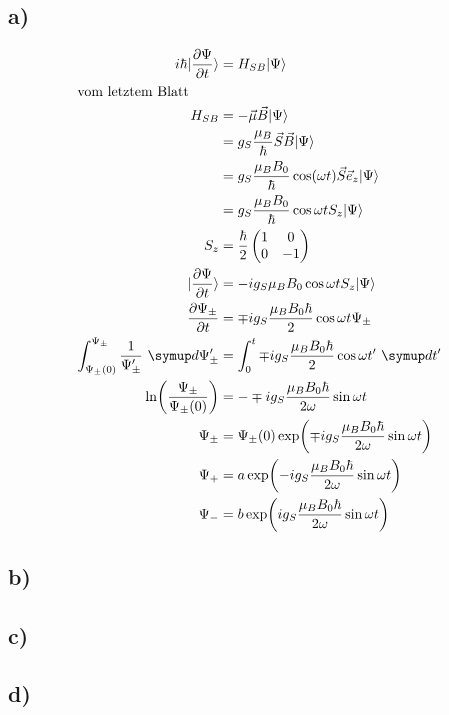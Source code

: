 \subsection{a)}
\begin{align}
    i \hbar \ket{\del{\Psi}{t}} &= H_{SB} \ket{\Psi}\\
    \intertext{vom letztem Blatt}
    H_{SB} &= - \vec{\mu} \vec B \ket{\Psi}\\
    &= g_S \frac{\mu _B}{\hbar} \vec S \vec B \ket{\Psi}\\
    &= g_S \frac{\mu _B B_0}{\hbar} \cos(\omega t) \vec S \vec e _z \ket{\Psi}\\
    &= g_S \frac{\mu _B B_0}{\hbar} \cos{ \omega t} S_z \ket{\Psi}\\
    S_z &= \frac{\hbar}{2} 
    \begin{pmatrix} 
        1 &0\\
        0 & -1\\
    \end{pmatrix}\\
    \ket{\del{\Psi}{t}} &= -i g_S \mu _B B_0 \cos{\omega t} S_z \ket{\Psi}\\
    \del{\Psi _{\pm}}{t} &= \mp i g_S \frac{\mu _B B_0 \hbar}{2} \cos{\omega t} \Psi _{\pm}\\
    \int _{\Psi _{\pm}(0)}^{\Psi_{\pm}} \frac{1}{\Psi'_{\pm}} \, \dif{\Psi _{\pm}' } &= \int_0^t \mp i g_S \frac{\mu _B B_0 \hbar}{2} \cos{\omega t'} \, \dif{t'}\\
    \ln(\frac{\Psi _{\pm}}{\Psi _{\pm}(0)}) &= - \mp ig_S \frac{\mu _B B_0 \hbar}{2\omega} \sin{\omega t}\\
    \Psi _{\pm} &= \Psi _{\pm }(0) \exp(\mp i g_S \frac{\mu _B B_0 \hbar}{2\omega} \sin{\omega t})\\
    \Psi_{+} &= a \exp(- i g_S \frac{\mu _B B_0 \hbar}{2\omega} \sin{\omega t})\\
    \Psi_{-} &=b \exp( i g_S \frac{\mu _B B_0 \hbar}{2\omega} \sin{\omega t})
\end{align}

\subsection{b)}

\subsection{c)}

\subsection{d)}

